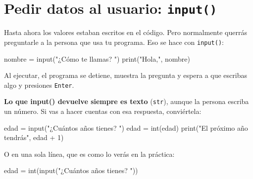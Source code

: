 \documentclass[
  spanish,
  letterpaper,
  DIV=11,
  numbers=noendperiod]{scrreprt}
\newenvironment{Shaded}{\begin{snugshade}}{\end{snugshade}}
\newcommand{\BuiltInTok}[1]{\textcolor[rgb]{0.00,0.23,0.31}{#1}}
\newcommand{\DecValTok}[1]{\textcolor[rgb]{0.68,0.00,0.00}{#1}}
\newcommand{\NormalTok}[1]{\textcolor[rgb]{0.00,0.23,0.31}{#1}}
\newcommand{\OperatorTok}[1]{\textcolor[rgb]{0.37,0.37,0.37}{#1}}
\newcommand{\StringTok}[1]{\textcolor[rgb]{0.13,0.47,0.30}{#1}}
\begin{document}
\section{\texorpdfstring{Pedir datos al usuario:
\texttt{input()}}{Pedir datos al usuario: input()}}\label{pedir-datos-al-usuario-input}

Hasta ahora los valores estaban escritos en el código. Pero normalmente
querrás preguntarle a la persona que usa tu programa. Eso se hace con
\texttt{input()}:

\begin{Shaded}
\begin{Highlighting}[]
\NormalTok{nombre }\OperatorTok{=} \BuiltInTok{input}\NormalTok{(}\StringTok{"¿Cómo te llamas? "}\NormalTok{)}
\BuiltInTok{print}\NormalTok{(}\StringTok{"Hola,"}\NormalTok{, nombre)}
\end{Highlighting}
\end{Shaded}

Al ejecutar, el programa se detiene, muestra la pregunta y espera a que
escribas algo y presiones \texttt{Enter}.

\begin{tcolorbox}[enhanced jigsaw, arc=.35mm, bottomrule=.15mm, bottomtitle=1mm, breakable, colback=white, colbacktitle=quarto-callout-important-color!10!white, colframe=quarto-callout-important-color-frame, coltitle=black, left=2mm, leftrule=.75mm, opacityback=0, opacitybacktitle=0.6, rightrule=.15mm, title=\textcolor{quarto-callout-important-color}{\faExclamation}\hspace{0.5em}{Importante}, titlerule=0mm, toprule=.15mm, toptitle=1mm]

\textbf{Lo que input() devuelve siempre es texto} (\texttt{str}), aunque
la persona escriba un número. Si vas a hacer cuentas con esa respuesta,
conviértela:

\begin{Shaded}
\begin{Highlighting}[]
\NormalTok{edad }\OperatorTok{=} \BuiltInTok{input}\NormalTok{(}\StringTok{"¿Cuántos años tienes? "}\NormalTok{)}
\NormalTok{edad }\OperatorTok{=} \BuiltInTok{int}\NormalTok{(edad)}
\BuiltInTok{print}\NormalTok{(}\StringTok{"El próximo año tendrás"}\NormalTok{, edad }\OperatorTok{+} \DecValTok{1}\NormalTok{)}
\end{Highlighting}
\end{Shaded}

O en una sola línea, que es como lo verás en la práctica:

\begin{Shaded}
\begin{Highlighting}[]
\NormalTok{edad }\OperatorTok{=} \BuiltInTok{int}\NormalTok{(}\BuiltInTok{input}\NormalTok{(}\StringTok{"¿Cuántos años tienes? "}\NormalTok{))}
\end{Highlighting}
\end{Shaded}

\end{tcolorbox}
\end{document}

